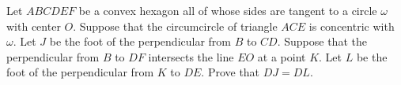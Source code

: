 Let $ABCDEF$ be a convex hexagon all of whose sides are tangent to a circle $\omega$ with center $O$. Suppose that the circumcircle of triangle $ACE$ is concentric with $\omega$. Let $J$ be the foot of the perpendicular from $B$ to $CD$. Suppose that the perpendicular from $B$ to $DF$ intersects the line $EO$ at a point $K$. Let $L$ be the foot of the perpendicular from $K$ to $DE$. Prove that $DJ = DL$.
